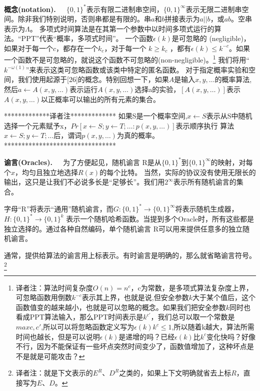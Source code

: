 \documentclass[]{article}
\begin{document}
    \textbf{概念(notation).}\ \ \ 
    $\{0,1\}^*$表示有限二进制串空间，$\{0,1\}^\infty$表示无限二进制串空间。除非我们特别说明，否则串都是有限的。串$a$和$b$拼接表示为$a||b$，或$ab$。空串表示为$\Lambda$。
    多项式时间算法是在其第一个参数中以时间多项式运行的算法。“PPT”代表“概率，多项式时间”。
    一个函数$\epsilon(k)$是可忽略的 (negligible)，如果对于每一个$c$，都存在一个$k_c$，对于每一个 $k\geq k_c$ ，都有$\epsilon(k)\leq k^{-c}$。如果一个函数不是可忽略的，就说这个函数不可忽略的(non-negligible)。\footnote{译者注：算法时间复杂度$O(n)=n^c$，c为常数，是多项式算法复杂度上界，可忽略函数用倒数$k^{-c}$表示其上界，也就是说,但安全参数$k$大于某个值后，这个函数值变的越来越小，也就是可以忽略的概念。如果我们把安全参数$k$同时也看成PPT算法输入，那么PPT时间表示是$k^{c'}$，我们总可以取一个常数是$max{c,c'}$,所以可以将忽略函数定义写为$\epsilon(k) k^c \leq 1$,所以随着k越大，算法所需时间也越长，但是可以说明$\epsilon(k)$是递增的吗？已经$\epsilon(k)$比$k^c$变化快吗？好像不行，因为不能保证有一些坏点突然时间变少了，函数值增加了，这种坏点是不是就是可能攻击？}
    我们将用“$k^{-\omega(1)}$”来表示这类可忽略函数或该类中特定的匿名函数。
    对于指定概率实验和空间，我们使用起源于[26]的概念。特别回想一下，如果$A$是输入$x,y,\ldots$的概率算法,然后$a\leftarrow A(x,y,\ldots)$表示运行$A(x,y,\ldots)$选择a的实验，$[A(x,y,\ldots)]$表示$A(x,y,\ldots)$以正概率可以输出的所有元素的集合。
    \par
    
    *************译者注*************
    如果S是一个概率空间,$x\leftarrow S$表示从S中随机选择一个元素赋予x，$Pr[x\leftarrow S;y\leftarrow T;\ldots:p(x,y,\ldots)]$表示顺序执行
    算法$x\leftarrow S;y\leftarrow T;\ldots$后，谓词$p(x,y,\ldots)$为真的概率。
    ********************************
    
    \textbf{谕言(Oracles).}\ \ \ 
    为了方便起见，随机谕言 R是从$\{0,1\}^*$到$\{0,1\}^\infty$的映射，对每个$x$，均匀且独立地选择$R(x)$的每个比特。
    当然，实际的协议没有使用无限长的输出，这只是让我们不必说多长是“足够长”。我们用$2^\infty$表示所有随机谕言的集合。
    
    
    字母“R”将表示“通用”随机谕言，而$G:\{0,1\}^*\rightarrow \{0,1\}^\infty$将表示随机生成器，$H:\{0,1\}^*\rightarrow \{0,1\}^k$ 表示一个随机哈希函数。当提到多个Oracle时，所有这些都是独立选择的。通过各种自然编码，单个随机谕言 R可以用来提供任意多的独立随机谕言。
    
    
    通常，提供给算法的谕言用上标表示。有时谕言是明确的，那么就省略谕言符号。\footnote{译者注：就是下文表示的$E^{R}$、$D^{R}$之类的，如果上下文明确就省去上标$R$，直接写为$E$、$D$。}
    
\end{document}
